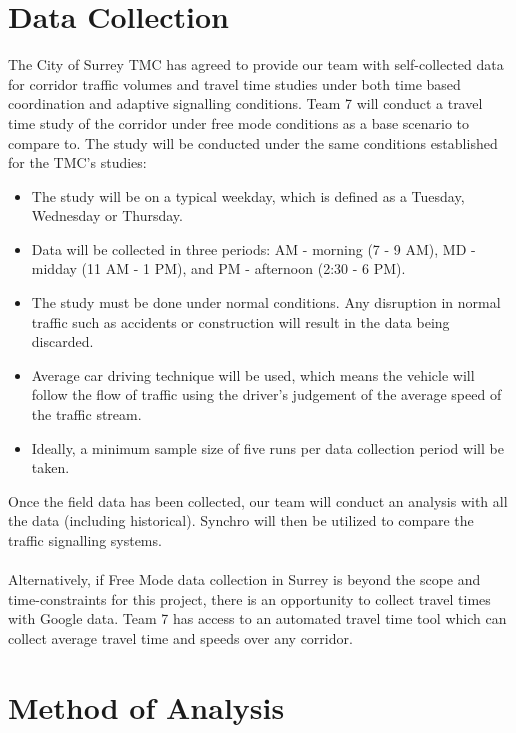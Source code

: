 \section{Data Collection}

The City of Surrey TMC has agreed to provide our team with self-collected data for corridor traffic volumes and travel time studies under both time based coordination and adaptive signalling conditions. Team 7 will conduct a travel time study of the corridor under free mode conditions as a base scenario to compare to. The study will be conducted under the same conditions established for the TMC’s studies:
\begin{itemize}
\item The study will be on a typical weekday, which is defined as a Tuesday, Wednesday or Thursday.
\item Data will be collected in three periods: AM - morning (7 - 9 AM), MD - midday (11 AM - 1 PM), and PM - afternoon (2:30 - 6 PM).
\item The study must be done under normal conditions.  Any disruption in normal traffic such as accidents or construction will result in the data being discarded.
\item Average car driving technique will be used, which means the vehicle will follow the flow of traffic using the driver’s judgement of the average speed of the traffic stream.
\item Ideally, a minimum sample size of five runs per data collection period will be taken.
\end{itemize}
Once the field data has been collected, our team will conduct an analysis with all the data (including historical). Synchro will then be utilized to compare the traffic signalling systems. \\ \\
Alternatively, if Free Mode data collection in Surrey is beyond the scope and time-constraints for this project, there is an opportunity to collect travel times with Google data. Team 7 has access to an automated travel time tool which can collect average travel time and speeds over any corridor.


\section{Method of Analysis}

